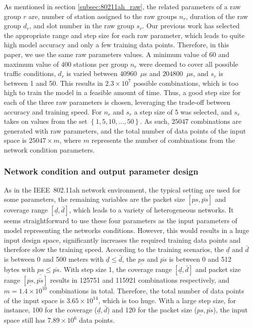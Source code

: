 As mentioned in section \ref{subsec:80211ah_raw}, the related parameters of a \gls{raw} group $r$ are, number of station assigned to the \gls{raw} groups $n_r$, duration of the \gls{raw} group $d_r$, and slot number in the \gls{raw} group $s_r$. Our previous work \cite{wowmom2018} has selected the appropriate range and step size for each \gls{raw} parameter, which leads to quite high model accuracy and only a few training data points. Therefore, in this paper, we use the same \gls{raw} parameters values. A minimum value of $60$ and maximum value of $400$ stations per group $n_r$ were deemed to cover all possible traffic conditions, $d_r$ is varied between $40960$~$\mu$s and $204800$~$\mu$s, and  $s_r$ is between 1 and 50. This results in $2.3 \times 10^7$ possible combinations, which is too high to train the model in a feasible amount of time. Thus, a good step
size for each of the three \gls{raw} parameters is chosen, leveraging the trade-off between accuracy and training speed.
For $n_r$ and $s_r$ a step size of 5 was selected, and $s_r$ takes on values from the set $\left\{1, 5, 10, ..., 50\right\}$. As such, $25047$ combinations are generated with \gls{raw} parameters, and the total number of data points of the input space is $25047 \times m$, where $m$ represents the number of combinations from the network condition parameters.

\subsubsection{Network condition and output parameter design \label{subsec:network_para_design}}

As in the IEEE~802.11ah network environment, the typical setting are used for  some parameters, the remaining variables are the  packet size  $[\underline{ps}, \bar{ps}]$ and coverage range $[\underline{d}, \bar{d}]$, which leads to a variety of heterogeneous networks. It seems straightforward to use these four parameters as the input parameters of model representing the networks conditions. However, this would results in a huge input design space, significantly increases the required training data points and therefore slow the training speed. According to the training scenarios, the $\underline{d}$ and $\bar{d}$ is between 0 and 500 meters with $\underline{d} \leq \bar{d}$, the $\underline{ps}$ and $\bar{ps}$ is between 0 and 512 bytes with $\underline{ps} \leq \bar{ps}$. With step size 1, the coverage range $[\underline{d}, \bar{d}]$ and packet size range $[\underline{ps}, \bar{ps}]$ results in 125751 and 115921 combinations respectively, and $m = 1.4 \times 10^{10} $ combinations in total. Therefore, the total number of data points of the input space is $3.65 \times  10^{14}$, which is too huge. With a large step size, for instance, 100 for  the coverage ($\underline{d}, \bar{d}$) and 120 for the packet size ($\underline{ps}, \bar{ps}$), the input space still has $7.89 \times  10^{6}$ data points.


